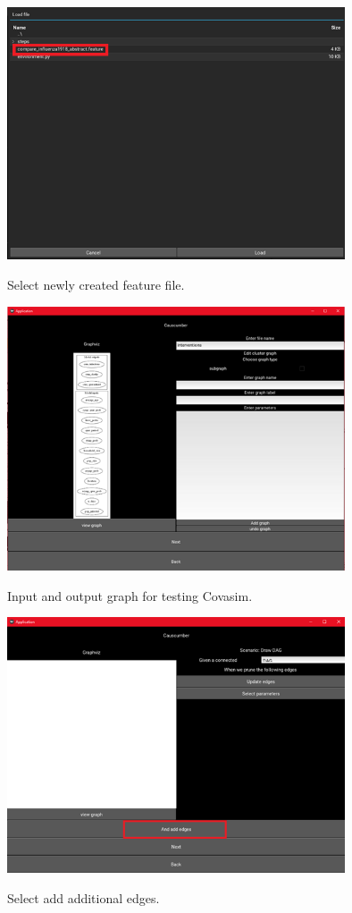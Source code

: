 \begin{figure}[H]
	\centering
	\includegraphics[width=10cm]{figures/influenzaTestProcess14.png}\\
	\caption{Select newly created feature file.}
	\label{fig:figure32}
\end{figure}
\begin{figure}[H]
	\centering
	\includegraphics[width=10cm]{figures/CovasimTestProcess1.png}\\
	\caption{Input and output graph for testing Covasim.}
	\label{fig:figure34}
\end{figure}
\begin{figure}[H]
	\centering
	\includegraphics[width=10cm]{figures/CovasimTestProcess4.png}\\
	\caption{Select add additional edges.}
	\label{fig:figure37}
\end{figure}
